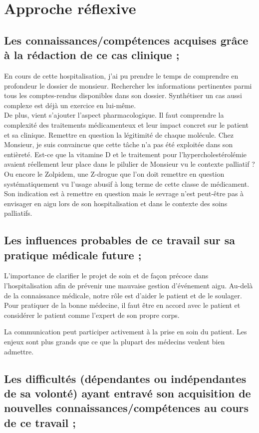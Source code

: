 \section{Approche réflexive}

\subsection{Les connaissances/compétences acquises grâce à la rédaction de ce cas clinique ;} 

En cours de cette hospitalisation, j’ai pu prendre le temps de comprendre en profondeur le dossier de monsieur. Rechercher les informations pertinentes parmi tous les comptes-rendus disponibles dans son dossier. Synthétiser un cas aussi complexe est déjà un exercice en lui-même.\\
De plus, vient s’ajouter l’aspect pharmacologique. Il faut comprendre la complexité des traitements médicamenteux et leur impact concret sur le patient et sa clinique. Remettre en question la légitimité de chaque molécule. Chez Monsieur, je suis convaincue que cette tâche n’a pas été exploitée dans son entièreté. Est-ce que la vitamine D et le traitement pour l’hypercholestérolémie avaient réellement leur place dans le pilulier de Monsieur vu le contexte palliatif ? Ou encore le Zolpidem, une Z-drogue que l’on doit remettre en question systématiquement vu l’usage abusif à long terme de cette classe de médicament. Son indication est à remettre en question  mais le sevrage n’est peut-être pas à envisager en aigu lors de son hospitalisation et dans le contexte des soins palliatifs.

\subsection{Les influences probables de ce travail sur sa pratique médicale future ;}

L’importance de clarifier le projet de soin et de façon précoce dans l’hospitalisation afin de prévenir une mauvaise gestion d’événement aigu. Au-delà de la connaissance médicale, notre rôle est d’aider le patient et de le soulager. Pour pratiquer de la bonne médecine, il faut être en accord avec le patient et considérer le patient comme l’expert de son propre corps.

La communication peut participer activement à la prise en soin du patient. Les enjeux sont plus grands que ce que la plupart des médecins veulent bien admettre.

\subsection{Les difficultés (dépendantes ou indépendantes de sa volonté) ayant entravé son acquisition de nouvelles connaissances/compétences au cours de ce travail ;}

